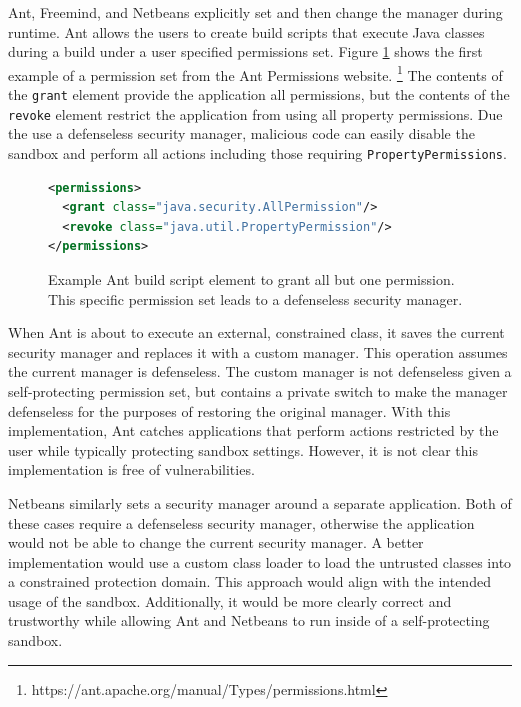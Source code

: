 \documentclass{sig-alternate}
\begin{document}
Ant, Freemind, and Netbeans explicitly set and then change the manager
during runtime. Ant allows the users to create build scripts that
execute Java classes during a build under a user specified
permissions set. Figure \ref{fig:Ant Permissions Example}
shows the first example of a permission set from the Ant Permissions website.%
\footnote{https://ant.apache.org/manual/Types/permissions.html%
} The contents of the \texttt{grant} element provide the application
all permissions, but the contents of the \texttt{revoke} element restrict
the application from using all property permissions. Due the use a
defenseless security manager, malicious code can easily disable the sandbox and perform all actions
including those requiring \texttt{PropertyPermissions}.

\begin{figure}
\begin{lstlisting}[language=XML,basicstyle={\scriptsize}]
<permissions>   
  <grant class="java.security.AllPermission"/>   
  <revoke class="java.util.PropertyPermission"/> 
</permissions>
\end{lstlisting}

\caption{Example Ant build script element to grant all but one permission.
This specific permission set leads to a defenseless security manager.}
\label{fig:Ant Permissions Example}
\end{figure}

When Ant is about to execute an external, constrained class, it saves the current security manager and replaces it with a custom manager. This operation assumes the current manager is defenseless. The custom manager is not defenseless given a self-protecting permission set, but contains a private switch to make the manager defenseless for the purposes of restoring the original manager. With this implementation, Ant catches applications that perform actions
restricted by the user while typically protecting sandbox settings. However, it is not clear this implementation
is free of vulnerabilities.

Netbeans similarly sets a security manager around a separate application.
Both of these cases require a defenseless security manager, otherwise
the application would not be able to change the current security manager.
A better implementation would use a custom class
loader to load the untrusted classes into a constrained protection
domain. This approach would align with the intended usage of the sandbox.
Additionally, it would be more clearly correct and trustworthy while
allowing Ant and Netbeans to run inside of a self-protecting sandbox.
\end{document}

